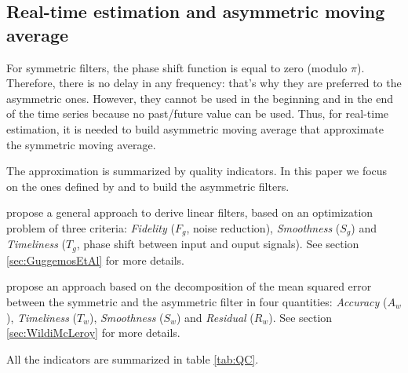 \documentclass[
  12pt,
  ,
  a4paper]{article}
\newcommand\1{\mathds{1}}
\begin{document}
\hypertarget{defAsymProb}{%
\subsection{Real-time estimation and asymmetric moving average}\label{defAsymProb}}

For symmetric filters, the phase shift function is equal to zero (modulo \(\pi\)).
Therefore, there is no delay in any frequency: that's why they are preferred to the asymmetric ones.
However, they cannot be used in the beginning and in the end of the time series because no past/future value can be used.
Thus, for real-time estimation, it is needed to build asymmetric moving average that approximate the symmetric moving average.

The approximation is summarized by quality indicators.
In this paper we focus on the ones defined by \textcite{ch15HBSA} and \textcite{trilemmaWMR2019} to build the asymmetric filters.

\textcite{ch15HBSA} propose a general approach to derive linear filters, based on an optimization problem of three criteria: \emph{Fidelity} (\(F_g\), noise reduction), \emph{Smoothness} (\(S_g\)) and \emph{Timeliness} (\(T_g\), phase shift between input and ouput signals).
See section \ref{sec:GuggemosEtAl} for more details.

\textcite{trilemmaWMR2019} propose an approach based on the decomposition of the mean squared error between the symmetric and the asymmetric filter in four quantities: \emph{Accuracy} (\(A_w\)), \emph{Timeliness} (\(T_w\)), \emph{Smoothness} (\(S_w\)) and \emph{Residual} (\(R_w\)).
See section \ref{sec:WildiMcLeroy} for more details.

All the indicators are summarized in table \ref{tab:QC}.
\end{document}
